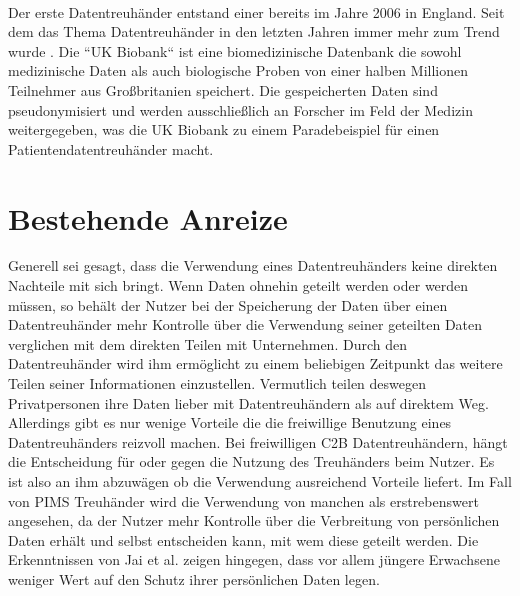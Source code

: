 \documentclass[11pt,a4paper]{scrreprt}
\begin{document}
\cite{dt-blankertz2021regulierung}\cite{dt-blankertz2021neue}\cite{dt-bundesdruckereiDatentreuhänder}\\

Der erste Datentreuhänder entstand einer bereits im Jahre 2006 in England. Seit dem das Thema Datentreuhänder in den letzten Jahren immer mehr zum Trend wurde \cite{dt-richter2020ddvtalk}. Die ``UK Biobank`` ist eine biomedizinische Datenbank die sowohl medizinische Daten als auch biologische Proben von einer halben Millionen Teilnehmer aus Großbritanien speichert\cite{dt-hardinges2018data}. Die gespeicherten Daten sind pseudonymisiert und werden ausschließlich an Forscher im Feld der Medizin weitergegeben, was die UK Biobank zu einem Paradebeispiel für einen Patientendatentreuhänder macht.



\section{Bestehende Anreize}
Generell sei gesagt, dass die Verwendung eines Datentreuhänders keine direkten Nachteile mit sich bringt. Wenn Daten ohnehin geteilt werden oder werden müssen, so behält der Nutzer bei der Speicherung der Daten über einen Datentreuhänder mehr Kontrolle über die Verwendung seiner geteilten Daten verglichen mit dem direkten Teilen mit Unternehmen. Durch den Datentreuhänder wird ihm ermöglicht zu einem beliebigen Zeitpunkt das weitere Teilen seiner Informationen einzustellen. Vermutlich teilen deswegen Privatpersonen ihre Daten lieber mit Datentreuhändern als auf direktem Weg. \cite{dt-tresor24study}\\

Allerdings gibt es nur wenige Vorteile die die freiwillige Benutzung eines Datentreuhänders reizvoll machen. Bei freiwilligen C2B Datentreuhändern, hängt die Entscheidung für oder gegen die Nutzung des Treuhänders beim Nutzer. Es ist also an ihm abzuwägen ob die Verwendung ausreichend Vorteile liefert. Im Fall von PIMS Treuhänder wird die Verwendung von manchen als erstrebenswert angesehen, da der Nutzer mehr Kontrolle über die Verbreitung von persönlichen Daten erhält und selbst entscheiden kann, mit wem diese geteilt werden. Die Erkenntnissen von Jai et al. \cite{dt-jai2016privacy} zeigen hingegen, dass vor allem jüngere Erwachsene weniger Wert auf den Schutz ihrer persönlichen Daten legen.
\end{document}
